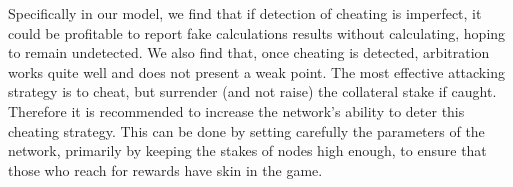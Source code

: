 \documentclass[conference]{IEEEtran}
\begin{document}
Specifically in our model, we find that if detection of cheating is imperfect, it could be profitable to report fake calculations results without calculating, hoping to remain undetected. We also find that, once cheating is detected, arbitration works quite well and does not present a weak point. The most effective attacking strategy is to cheat, but surrender (and not raise) the collateral stake if caught. Therefore it is recommended to increase  the network's ability to deter this cheating strategy. This can be done by setting carefully the parameters of the network, primarily by keeping the stakes of nodes high enough, to ensure that those who reach for rewards have skin in the game.

\nocite{*}


\end{document}
